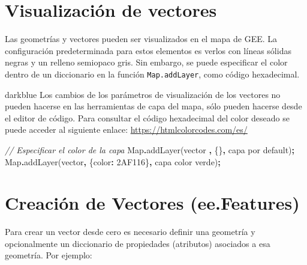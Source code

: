 \documentclass[
  12pt,
  letterpaper,
  twoside]{book}
\newenvironment{Shaded}{\begin{snugshade}}{\end{snugshade}}
\newcommand{\BuiltInTok}[1]{#1}
\newcommand{\CommentTok}[1]{\textcolor[rgb]{0.56,0.35,0.01}{\textit{#1}}}
\newcommand{\DataTypeTok}[1]{\textcolor[rgb]{0.13,0.29,0.53}{#1}}
\newcommand{\FunctionTok}[1]{\textcolor[rgb]{0.00,0.00,0.00}{#1}}
\newcommand{\NormalTok}[1]{#1}
\newcommand{\OperatorTok}[1]{\textcolor[rgb]{0.81,0.36,0.00}{\textbf{#1}}}
\newcommand{\StringTok}[1]{\textcolor[rgb]{0.31,0.60,0.02}{#1}}
\begin{document}
\hypertarget{visualizaciuxf3n-de-vectores}{%
\section{Visualización de vectores}\label{visualizaciuxf3n-de-vectores}}

Las geometrías y vectores pueden ser visualizados en el mapa de GEE. La configuración predeterminada para estos elementos es verlos con líneas sólidas negras y un relleno semiopaco gris. Sin embargo, se puede especificar el color dentro de un diccionario en la función \texttt{Map.addLayer}, como código hexadecimal.

\begin{bluebox2}

\begin{awesomeblock}{5pt}{\faLightbulb}{darkblue}
Los cambios de los parámetros de visualización de los vectores no pueden hacerse en las herramientas de capa del mapa, sólo pueden hacerse desde el editor de código. Para consultar el código hexadecimal del color deseado se puede acceder al siguiente enlace: \url{https://htmlcolorcodes.com/es/}

\end{awesomeblock}

\end{bluebox2}

\begin{Shaded}
\begin{Highlighting}[]
\CommentTok{// Especificar el color de la capa }
\BuiltInTok{Map}\OperatorTok{.}\FunctionTok{addLayer}\NormalTok{(vector }\OperatorTok{,}\NormalTok{ \{\}}\OperatorTok{,} \StringTok{\textquotesingle{}capa por default\textquotesingle{}}\NormalTok{)}\OperatorTok{;}
\BuiltInTok{Map}\OperatorTok{.}\FunctionTok{addLayer}\NormalTok{(vector}\OperatorTok{,}\NormalTok{ \{}\DataTypeTok{color}\OperatorTok{:} \StringTok{\textquotesingle{}2AF116\textquotesingle{}}\NormalTok{\}}\OperatorTok{,} \StringTok{\textquotesingle{}capa color verde\textquotesingle{}}\NormalTok{)}\OperatorTok{;}
\end{Highlighting}
\end{Shaded}

\hypertarget{creaciuxf3n-de-vectores-ee.features}{%
\section{Creación de Vectores (ee.Features)}\label{creaciuxf3n-de-vectores-ee.features}}

Para crear un vector desde cero es necesario definir una geometría y opcionalmente un diccionario de propiedades (atributos) asociados a esa geometría. Por ejemplo:
\end{document}
